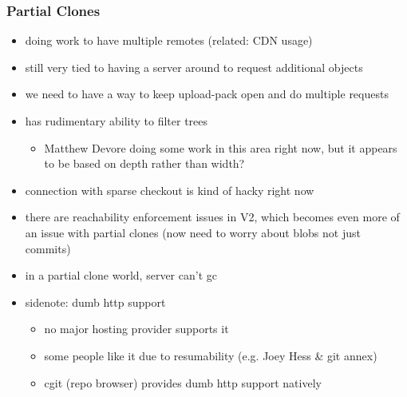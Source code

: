 \documentclass[t]{beamer}
\begin{document}

\begin{frame}
  \frametitle{Partial Clones}

  \begin{itemize}
    \item doing work to have multiple remotes (related: CDN usage)
    
    \item still very tied to having a server around to request
      additional objects
      
    \item we need to have a way to keep upload-pack open and do
      multiple requests
      
    \item has rudimentary ability to filter trees
    \begin{itemize}
      \item Matthew Devore doing some work in this area right now, but it
            appears to be based on depth rather than width?
    \end{itemize}
    \item connection with sparse checkout is kind of hacky right now
    \item there are reachability enforcement issues in V2, which becomes even
      more of an issue with partial clones (now need to worry about blobs not
      just commits)
    \item in a partial clone world, server can't gc
    \item sidenote: dumb http support
    \begin{itemize}
      \item no major hosting provider supports it
      \item some people like it due to resumability (e.g. Joey Hess \& git
            annex)
      \item cgit (repo browser) provides dumb http support natively
    \end{itemize}
  \end{itemize}

\end{frame}

\end{document}
